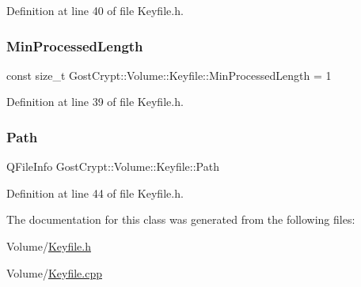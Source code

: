 Definition at line 40 of file Keyfile.\+h.

\mbox{\label{class_gost_crypt_1_1_volume_1_1_keyfile_af969985bceb0b13080c438e82c76ec08}} 
\subsubsection{\texorpdfstring{Min\+Processed\+Length}{MinProcessedLength}}
{\footnotesize\ttfamily const size\+\_\+t Gost\+Crypt\+::\+Volume\+::\+Keyfile\+::\+Min\+Processed\+Length = 1\hspace{0.3cm}{\ttfamily [static]}}



Definition at line 39 of file Keyfile.\+h.

\mbox{\label{class_gost_crypt_1_1_volume_1_1_keyfile_a361fb705338bf371e4f151d24c2c4d84}} 
\subsubsection{\texorpdfstring{Path}{Path}}
{\footnotesize\ttfamily Q\+File\+Info Gost\+Crypt\+::\+Volume\+::\+Keyfile\+::\+Path\hspace{0.3cm}{\ttfamily [protected]}}



Definition at line 44 of file Keyfile.\+h.



The documentation for this class was generated from the following files\+:\begin{DoxyCompactItemize}
\item 
Volume/\hyperlink{_keyfile_8h}{Keyfile.\+h}\item 
Volume/\hyperlink{_keyfile_8cpp}{Keyfile.\+cpp}\end{DoxyCompactItemize}
